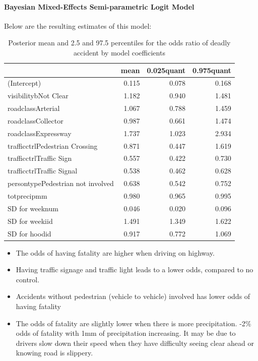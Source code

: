\documentclass[]{article}
\providecommand{\tightlist}{%
  \setlength{\itemsep}{0pt}\setlength{\parskip}{0pt}}
\let\oldparagraph\paragraph
\renewcommand{\paragraph}[1]{\oldparagraph{#1}\mbox{}}
\begin{document}
\paragraph{Bayesian Mixed-Effects Semi-parametric Logit
Model}\label{bayesian-mixed-effects-semi-parametric-logit-model-1}

Below are the resulting estimates of this model:

\begin{table}[!h]

\caption{\label{tab:unnamed-chunk-21}Posterior mean and 2.5 and 97.5 percentiles for the odds ratio of deadly accident by model coefficients}
\centering
\begin{tabular}{lrrr}
\toprule
  & mean & 0.025quant & 0.975quant\\
\midrule
(Intercept) & 0.115 & 0.078 & 0.168\\
visibilitybNot Clear & 1.182 & 0.940 & 1.481\\
roadclassArterial & 1.067 & 0.788 & 1.459\\
roadclassCollector & 0.987 & 0.661 & 1.474\\
roadclassExpressway & 1.737 & 1.023 & 2.934\\
trafficctrlPedestrian Crossing & 0.871 & 0.447 & 1.619\\
trafficctrlTraffic Sign & 0.557 & 0.422 & 0.730\\
trafficctrlTraffic Signal & 0.538 & 0.462 & 0.628\\
persontypePedestrian not involved & 0.638 & 0.542 & 0.752\\
totprecipmm & 0.980 & 0.965 & 0.995\\
SD for weeknum & 0.046 & 0.020 & 0.096\\
SD for weekiid & 1.491 & 1.349 & 1.622\\
SD for hoodid & 0.917 & 0.772 & 1.069\\
\bottomrule
\end{tabular}
\end{table}

\begin{itemize}
\tightlist
\item
  The odds of having fatality are higher when driving on highway.
\item
  Having traffic signage and traffic light leads to a lower odds,
  compared to no control.
\item
  Accidents without pedestrian (vehicle to vehicle) involved has lower
  odds of having fatality
\item
  The odds of fatality are slightly lower when there is more
  precipitation. -2\% odds of fatality with 1mm of precipitation
  increasing. It may be due to drivers slow down their speed when they
  have difficulty seeing clear ahead or knowing road is slippery.
\end{itemize}
\end{document}
